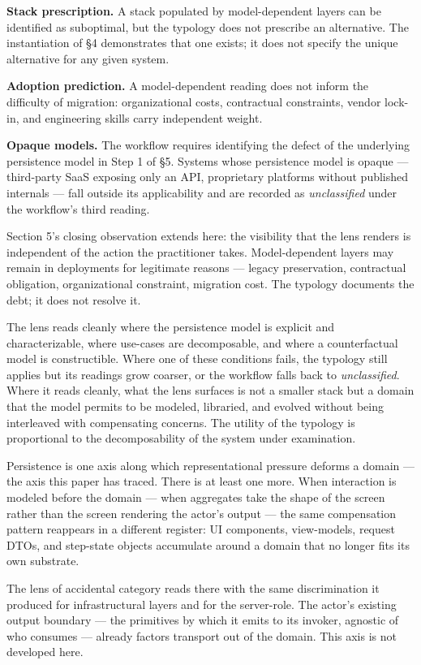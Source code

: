 \documentclass[
]{article}
\begin{document}
\textbf{Stack prescription.} A stack populated by model-dependent layers
can be identified as suboptimal, but the typology does not prescribe an
alternative. The instantiation of §4 demonstrates that one exists; it
does not specify the unique alternative for any given system.

\textbf{Adoption prediction.} A model-dependent reading does not inform
the difficulty of migration: organizational costs, contractual
constraints, vendor lock-in, and engineering skills carry independent
weight.

\textbf{Opaque models.} The workflow requires identifying the defect of
the underlying persistence model in Step 1 of §5. Systems whose
persistence model is opaque --- third-party SaaS exposing only an API,
proprietary platforms without published internals --- fall outside its
applicability and are recorded as \emph{unclassified} under the
workflow's third reading.

Section 5's closing observation extends here: the visibility that the
lens renders is independent of the action the practitioner takes.
Model-dependent layers may remain in deployments for legitimate reasons
--- legacy preservation, contractual obligation, organizational
constraint, migration cost. The typology documents the debt; it does not
resolve it.

The lens reads cleanly where the persistence model is explicit and
characterizable, where use-cases are decomposable, and where a
counterfactual model is constructible. Where one of these conditions
fails, the typology still applies but its readings grow coarser, or the
workflow falls back to \emph{unclassified}. Where it reads cleanly, what
the lens surfaces is not a smaller stack but a domain that the model
permits to be modeled, libraried, and evolved without being interleaved
with compensating concerns. The utility of the typology is proportional
to the decomposability of the system under examination.

Persistence is one axis along which representational pressure deforms a
domain --- the axis this paper has traced. There is at least one more.
When interaction is modeled before the domain --- when aggregates take
the shape of the screen rather than the screen rendering the actor's
output --- the same compensation pattern reappears in a different
register: UI components, view-models, request DTOs, and step-state
objects accumulate around a domain that no longer fits its own
substrate.

The lens of accidental category reads there with the same discrimination
it produced for infrastructural layers and for the server-role. The
actor's existing output boundary --- the primitives by which it emits to
its invoker, agnostic of who consumes --- already factors transport out
of the domain. This axis is not developed here.
\end{document}
